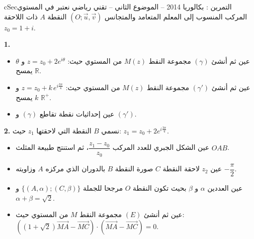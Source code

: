 \documentclass[12pt,a4paper]{article}
\newenvironment{BOX}[2]{\begin{otherlanguage}{english}\begin{arbox}{#1}{#2}}{\end{arbox}\end{otherlanguage}}
\newcounter{exo}
\newenvironment{tamrin}[1]{\stepcounter{exo}\begin{BOX}{cSec}{التمرين \theexo: #1}}{\end{BOX}}
\newenvironment{sq}{\begin{itemize}[leftmargin=2.4em,itemsep=3pt]}{\end{itemize}}
\newcommand{\qa}{\item[(أ)]}\newcommand{\qb}{\item[(ب)]}\newcommand{\qc}{\item[(جـ)]}\newcommand{\qd}{\item[(د)]}\newcommand{\qe}{\item[(هـ)]}
\newcommand{\QQ}[1]{\par\smallskip\textbf{#1.} }
\begin{document}
\begin{tamrin}{بكالوريا 2014 -- الموضوع الثاني -- تقني رياضي}
نعتبر في المستوي المركب المنسوب إلى المعلم المتعامد والمتجانس $(O;\vec u,\vec v)$ النقطة $A$ ذات اللاحقة $z_0=1+i$.

\QQ{1}
\begin{sq}
\qa عين ثم أنشئ $(\gamma)$ مجموعة النقط $M(z)$ من المستوي حيث: $z=z_0+2e^{i\theta}$ و $\theta$ يمسح $\mathbb{R}$.
\qb عين ثم أنشئ $(\gamma')$ مجموعة النقط $M(z)$ من المستوي حيث: $z=z_0+k\,e^{i\frac{3\pi}{4}}$ و $k$ يمسح $\mathbb{R}^+$.
\qc عين إحداثيات نقطة تقاطع $(\gamma)$ و $(\gamma')$.
\end{sq}
\QQ{2} نسمي $B$ النقطة التي لاحقتها $z_1$ حيث: $z_1=z_0+2e^{i\frac{3\pi}{4}}$.
\begin{sq}
\qa عين الشكل الجبري للعدد المركب $\dfrac{z_1-z_0}{z_0}$، ثم استنتج طبيعة المثلث $OAB$.
\qb عين $z_2$ لاحقة النقطة $C$ صورة النقطة $B$ بالدوران الذي مركزه $A$ وزاويته $-\dfrac{\pi}{2}$.
\qc عين العددين $\alpha$ و $\beta$ بحيث تكون النقطة $O$ مرجحا للجملة $\{(A,\alpha);(C,\beta)\}$ و $\alpha+\beta=\sqrt2$.
\qd عين ثم أنشئ $(E)$ مجموعة النقط $M$ من المستوي حيث: $\left((1+\sqrt2)\overrightarrow{MA}-\overrightarrow{MC}\right)\cdot\left(\overrightarrow{MA}-\overrightarrow{MC}\right)=0$.
\end{sq}
\end{tamrin}
\end{document}
